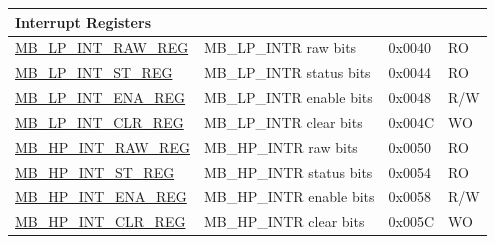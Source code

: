 \begin{longtable}{ | p{6cm} | p{7.2cm} | p{1.3cm} | p{1cm} | }
\multicolumn{4}{|l|}{\textbf{Interrupt Registers}} \\ \hline
\hyperref[regdesc:MBLPINTRAWREG]{MB\_LP\_INT\_RAW\_REG} & MB\_LP\_INTR raw bits & 0x0040 & RO \\ \hline
\hyperref[regdesc:MBLPINTSTREG]{MB\_LP\_INT\_ST\_REG} & MB\_LP\_INTR status bits & 0x0044 & RO \\ \hline
\hyperref[regdesc:MBLPINTENAREG]{MB\_LP\_INT\_ENA\_REG} & MB\_LP\_INTR enable bits & 0x0048 & R/W \\ \hline
\hyperref[regdesc:MBLPINTCLRREG]{MB\_LP\_INT\_CLR\_REG} & MB\_LP\_INTR clear bits & 0x004C & WO \\ \hline
\hyperref[regdesc:MBHPINTRAWREG]{MB\_HP\_INT\_RAW\_REG} & MB\_HP\_INTR raw bits & 0x0050 & RO \\ \hline
\hyperref[regdesc:MBHPINTSTREG]{MB\_HP\_INT\_ST\_REG} & MB\_HP\_INTR status bits & 0x0054 & RO \\ \hline
\hyperref[regdesc:MBHPINTENAREG]{MB\_HP\_INT\_ENA\_REG} & MB\_HP\_INTR enable bits & 0x0058 & R/W \\ \hline
\hyperref[regdesc:MBHPINTCLRREG]{MB\_HP\_INT\_CLR\_REG} & MB\_HP\_INTR clear bits & 0x005C & WO \\ \hline
\end{longtable}
